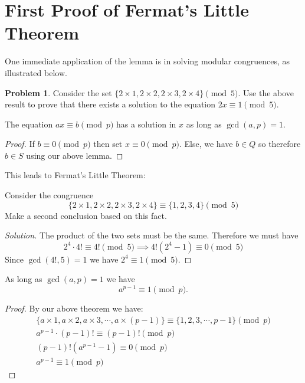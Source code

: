 \documentclass[12pt,openany]{book}
\theoremstyle{definition}
\newenvironment{soln}{\begin{proof}[Solution]}{\end{proof}}
\newtheorem{prob}{Problem}[section]
\theoremstyle{definition}
\begin{document}
\section{First Proof of Fermat's Little Theorem}

One immediate application of the lemma is in solving modular congruences, as illustrated below.  

\begin{prob}  Consider the set $\{2\times 1, 2\times 2, 2\times 3, 2\times 4\}\pmod{5}$.  Use the above result to prove that there exists a solution to the equation $2x\equiv 1\pmod{5}$.  \end{prob}

\begin{thm}  The equation $ax\equiv b\pmod{p}$ has a solution in $x$ as long as $\gcd(a,p)=1$.  \end{thm}
\begin{proof}  If $b\equiv 0\pmod{p}$ then set $x\equiv 0\pmod{p}$.  Else, we have $b\in Q$ so therefore $b\in S$ using our above lemma.  \end{proof}

This leads to Fermat's Little Theorem:  

\begin{exmp}  Consider the congruence $$\{2\times 1, 2\times 2, 2\times 3, 2\times 4\}\equiv \{1,2,3,4\}\pmod{5}$$  Make a second conclusion based on this fact.  \end{exmp}

\begin{soln}  The product of the two sets must be the same.  Therefore we must have $$2^4\cdot 4!\equiv 4!\pmod{5}\implies 4!\left(2^4-1\right)\equiv 0\pmod{5}$$
Since $\gcd(4!, 5)=1$ we have $2^4\equiv 1\pmod{5}$.  \end{soln}

\begin{thm}  As long as $\gcd(a,p)=1$ we have $$a^{p-1}\equiv 1\pmod{p}.$$ \end{thm}
\begin{proof}  By our above theorem we have:  \begin{eqnarray*} \{a\times 1, a\times 2, a\times 3,\cdots, a\times (p-1)\}\equiv \{1,2,3,\cdots, p-1\}\pmod{p} \\ a^{p-1}\cdot (p-1)!\equiv (p-1)!\pmod{p} \\ \left(p-1\right)!\left(a^{p-1}-1\right)\equiv 0\pmod{p} \\ a^{p-1}\equiv 1\pmod{p} \end{eqnarray*} \end{proof}
\end{document}
